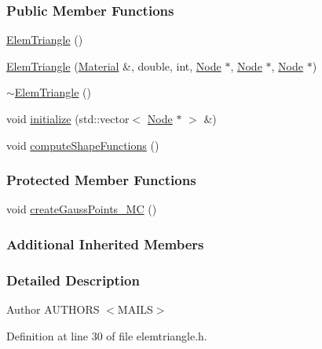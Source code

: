 \subsubsection*{Public Member Functions}
\begin{DoxyCompactItemize}
\item 
\hyperlink{classmknix_1_1_elem_triangle_a3f2e00ba6769185cc6dc8f11f073d5cd}{Elem\+Triangle} ()
\item 
\hyperlink{classmknix_1_1_elem_triangle_a01f7c2e3827dcfbc657b17aa6610b8dc}{Elem\+Triangle} (\hyperlink{classmknix_1_1_material}{Material} \&, double, int, \hyperlink{classmknix_1_1_node}{Node} $\ast$, \hyperlink{classmknix_1_1_node}{Node} $\ast$, \hyperlink{classmknix_1_1_node}{Node} $\ast$)
\item 
\hyperlink{classmknix_1_1_elem_triangle_a7a29ea213e5eb2567702ab1cd01468c4}{$\sim$\+Elem\+Triangle} ()
\item 
void \hyperlink{classmknix_1_1_elem_triangle_a5ddf93646f4b35632801fd28bc8e14a2}{initialize} (std\+::vector$<$ \hyperlink{classmknix_1_1_node}{Node} $\ast$ $>$ \&)
\item 
void \hyperlink{classmknix_1_1_elem_triangle_a6d97673aa922fca3c84ae23255b76223}{compute\+Shape\+Functions} ()
\end{DoxyCompactItemize}
\subsubsection*{Protected Member Functions}
\begin{DoxyCompactItemize}
\item 
void \hyperlink{classmknix_1_1_elem_triangle_a621f85e7743f5382cb553f1bef1b2235}{create\+Gauss\+Points\+\_\+\+M\+C} ()
\end{DoxyCompactItemize}
\subsubsection*{Additional Inherited Members}


\subsubsection{Detailed Description}
\begin{DoxyAuthor}{Author}
A\+U\+T\+H\+O\+R\+S $<$\+M\+A\+I\+L\+S$>$ 
\end{DoxyAuthor}


Definition at line 30 of file elemtriangle.\+h.



